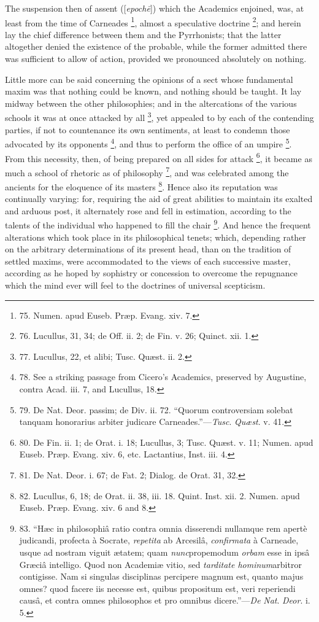 The suspension then of assent
([\emph{epoch\={e}}]) which the Academics enjoined, was, at
least from the time of Carneades \footnote{75. Numen. apud Euseb. Præp.
Evang. xiv. 7.}, almost a speculative doctrine \footnote{76. Lucullus, 31, 34; de Off.
ii. 2; de Fin. v. 26; Quinct. xii. 1.}; and herein lay the chief difference between them and the
Pyrrhonists; that the latter altogether denied the existence of the
probable, while the former admitted there was sufficient to allow of
action, provided we pronounced absolutely on nothing.

Little more can be said
concerning the opinions of a sect whose fundamental maxim was that
nothing could be known, and nothing should be taught. It lay midway
between the other philosophies; and in the altercations of the various
schools it was at once attacked by all \footnote{77. Lucullus, 22, et alibi;
Tusc. Quæst. ii. 2.}, yet appealed to by each of the contending parties, if not to countenance its own sentiments, at least to condemn those
advocated by its opponents \footnote{78. See a striking passage
from Cicero's Academics, preserved by Augustine, contra Acad. iii. 7,
and Lucullus, 18.},
and thus to perform the office of an umpire \footnote{79. De Nat. Deor. passim; de
Div. ii. 72. ``Quorum controversiam solebat tanquam honorarius arbiter
judicare Carneades.''—\emph{Tusc}. \emph{Quæst}. v. 41.}. From this necessity, then, of being prepared on all sides for
attack \footnote{80. De Fin. ii. 1; de Orat. i.
18; Lucullus, 3; Tusc. Quæst. v. 11; Numen. apud Euseb. Præp. Evang.
xiv. 6, etc. Lactantius, Inst. iii. 4.}, it became as
much a school of rhetoric as of philosophy \footnote{81. De Nat. Deor. i. 67; de
Fat. 2; Dialog. de Orat. 31, 32.}, and was celebrated among the ancients for the eloquence of
its masters \footnote{82. Lucullus, 6, 18; de Orat.
ii. 38, iii. 18. Quint. Inst. xii. 2. Numen. apud Euseb. Præp. Evang.
xiv. 6 and 8.}. Hence
also its reputation was continually varying: for, requiring the aid of
great abilities to maintain its exalted and arduous post, it
alternately rose and fell in estimation, according to the talents of
the individual who happened to fill the chair \footnote{83. ``Hæc in philosophiâ
ratio contra omnia disserendi nullamque rem apertè judicandi,
profecta à Socrate, \emph{repetita} ab Arcesilâ, \emph{confirmata}
à Carneade, usque ad nostram viguit ætatem; quam \emph{nunc}propemodum
\emph{orbam} esse in ipsâ Græciâ intelligo. Quod non Academiæ
vitio, sed \emph{tarditate hominum}arbitror contigisse. Nam si
singulas disciplinas percipere magnum est, quanto majus omnes? quod
facere iis necesse est, quibus propositum est, veri reperiendi causâ,
et contra omnes philosophos et pro omnibus dicere.''—\emph{De} \emph{Nat}.
\emph{Deor}. i. 5.}. And hence the frequent alterations which took place in its
philosophical tenets; which, depending rather on the arbitrary
determinations of its present head, than on the tradition of settled
maxims, were accommodated to the views of each successive master,
according as he hoped by sophistry or concession to overcome the
repugnance which the mind ever will feel to the doctrines of universal
scepticism.

